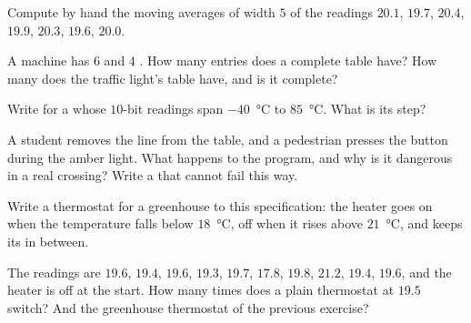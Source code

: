 \begin{exercise}[$\star$]\label{exo:g10:sensors-actuators-control:3}
Compute by hand the moving averages of width $5$ of the readings $20.1$, $19.7$, $20.4$, $19.9$, $20.3$, $19.6$,
$20.0$.
\end{exercise}

\begin{exercise}[$\star$]\label{exo:g10:sensors-actuators-control:4}
A machine has $6$  and $4$ . How many entries does a complete  table have? How many does the
traffic light's table have, and is it complete?
\end{exercise}

\begin{exercise}[$\star$]\label{exo:g10:sensors-actuators-control:5}
Write  for a  whose $10$-bit readings span $-40$~°C to $85$~°C. What is its step?
\end{exercise}

\begin{exercise}[$\star\star$]\label{exo:g10:sensors-actuators-control:6}
A student removes the line  from the table, and a pedestrian presses the button
during the amber light. What happens to the program, and why is it dangerous in a real crossing? Write a
 that cannot fail this way.
\end{exercise}

\begin{exercise}[$\star\star$]\label{exo:g10:sensors-actuators-control:7}
Write a thermostat for a greenhouse to this specification: the heater goes on when the temperature falls below
$18$~°C, off when it rises above $21$~°C, and keeps its  in between.
\end{exercise}

\begin{exercise}[$\star\star$]\label{exo:g10:sensors-actuators-control:8}
The readings are $19.6$, $19.4$, $19.6$, $19.3$, $19.7$, $17.8$, $19.8$, $21.2$, $19.4$, $19.6$, and the heater is
off at the start. How many times does a plain thermostat at $19.5$ switch? And the greenhouse thermostat of the
previous exercise?
\end{exercise}

